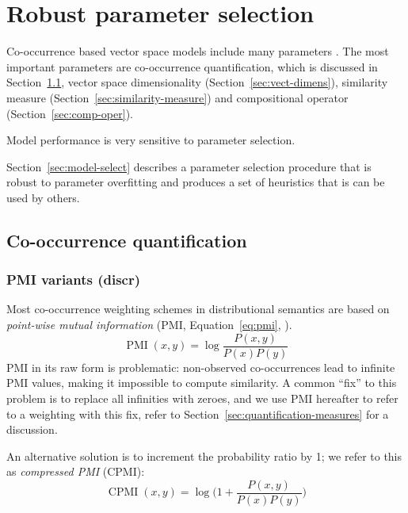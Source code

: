 \chapter{Robust parameter selection}
\label{sec:methodology}

Co-occurrence based vector space models include many parameters \cite{Turney:2010:FMV:1861751.1861756,kiela-clark:2014:CVSC,TACL570}. The most important parameters are co-occurrence quantification, which is discussed in Section~\ref{sec:quantification}, vector space dimensionality (Section~\ref{sec:vect-dimens}), similarity measure (Section~\ref{sec:similarity-measure}) and compositional operator (Section~\ref{sec:comp-oper}).

Model performance is very sensitive to parameter selection.


Section~\ref{sec:model-select} describes a parameter selection procedure that is robust to parameter overfitting and produces a set of heuristics that is can be used by others.

\section{Co-occurrence quantification}
\label{sec:quantification}

\subsection{PMI variants (discr)}
\label{sec:pmi-variants}

Most co-occurrence weighting schemes in distributional semantics are based on \emph{point-wise mutual information} (PMI, Equation~\ref{eq:pmi}, ).
%
\begin{equation}
  \label{eq:pmi}
  \operatorname{PMI}(x, y) = \log\frac{P(x,y)}{P(x)P(y)}
\end{equation}
%
PMI in its raw form is problematic: non-observed co-occurrences lead to infinite PMI values, making it impossible to compute similarity. A common ``fix'' to this problem is to replace all infinities with zeroes, and we use PMI hereafter to refer to a weighting with this fix, refer to Section~\ref{sec:quantification-measures} for a discussion.

An alternative solution is to increment the probability ratio by 1; we refer to this as \textit{compressed PMI} (CPMI):
%
\begin{equation}
  \label{eq:cpmi}
  \operatorname{CPMI}(x, y) = \log\Big( 1 + \frac{P(x,y)}{P(x)P(y)} \Big)
\end{equation}

